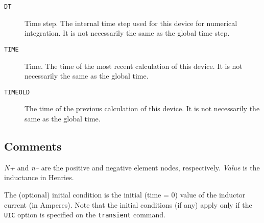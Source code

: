 \begin{description}

\item[{\tt DT}] Time step.  The internal time step used for this
device for numerical integration.  It is not necessarily the same as
the global time step.

\item[{\tt TIME}] Time.  The time of the most recent calculation of this
device.   It is not necessarily the same as the global time.

\item[{\tt TIMEOLD}] The time of the previous calculation of this
device.  It is not necessarily the same as the global time.

\end{description}
\subsection{Comments}

{\it N+} and {\it n--} are the positive and negative element nodes,
respectively.  {\it Value} is the inductance in Henries.


The (optional) initial condition is the initial (time = 0) value of the
inductor current (in Amperes).  
Note that the initial conditions (if any)
apply only if the {\tt UIC} option is specified on the {\tt transient}
command.
